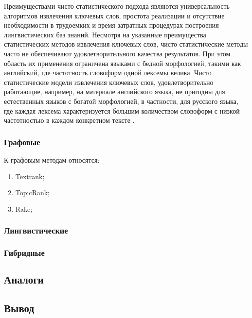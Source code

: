 
Преимуществами чисто статистического подхода являются универсальность алгоритмов извлечения ключевых слов, простота реализации и отсутствие необходимости в трудоемких и время-затратных процедурах построения лингвистических баз знаний.
Несмотря на указанные преимущества статистических методов извлечения ключевых слов, чисто статистические методы часто не обеспечивают удовлетворительного качества результатов. 
При этом область их применения ограничена языками с бедной морфологией, такими как английский, где частотность словоформ одной лексемы велика. 
Чисто статистические модели извлечения ключевых слов, удовлетворительно работающие, например, на материале английского языка, не пригодны для естественных языков с богатой морфологией, в частности, для русского языка, где каждая лексема характеризуется большим количеством словоформ с низкой частотностью в каждом конкретном тексте \cite{9}.

\subsubsection{Графовые}

К графовым методам относятся:
\begin{enumerate}
	\item Textrank;
	\item TopicRank;
	\item Rake;
\end{enumerate}


\subsubsection{Лингвистические}
\subsubsection{Гибридные}
\subsection{Аналоги}
\subsection{Вывод}

